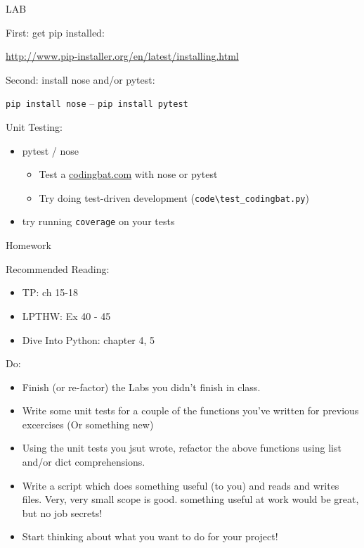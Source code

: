 \documentclass{beamer}
\begin{document}
\begin{frame}[fragile]{LAB}

{\Large First: get pip installed:}

{\small \url{http://www.pip-installer.org/en/latest/installing.html} }

\vfill
{\Large Second: install nose and/or pytest:}

{\large \verb|pip install nose| -- \verb|pip install pytest|}


\vfill
{\Large Unit Testing:}

\begin{itemize}
  \item pytest / nose
    \begin{itemize}
       \item Test a \url{codingbat.com} with nose or pytest
       \item Try doing test-driven development
         (\verb|code\test_codingbat.py|)
    \end{itemize}

  \item try running \verb|coverage| on your tests
\end{itemize}

\end{frame}



\begin{frame}[fragile]{Homework}

Recommended Reading:
\begin{itemize}
  \item TP: ch 15-18
  \item LPTHW: Ex 40 - 45
  \item Dive Into Python: chapter 4, 5 
\end{itemize}

Do:
\begin{itemize}
  \item Finish (or re-factor) the Labs you didn't finish in class.
  \item Write some unit tests for a couple of the functions you've
        written for previous excercises (Or something new)
  \item Using the unit tests you jsut wrote, refactor the above functions
        using list and/or dict comprehensions.
  \item Write a script which does something useful (to you) and reads and writes
        files. Very, very small scope is good. something useful at work would
        be great, but no job secrets!
  \item Start thinking about what you want to do for your project!
\end{itemize}


\end{frame}
\end{document}
